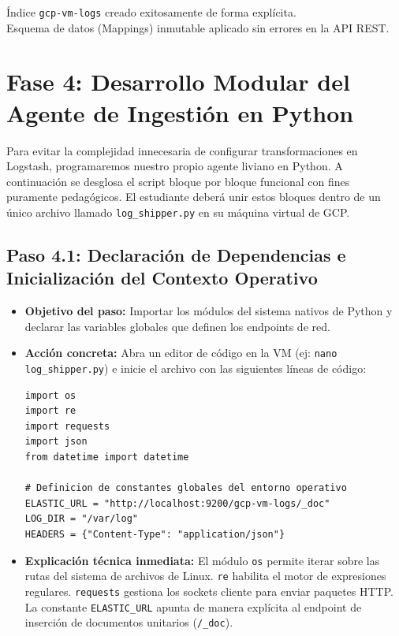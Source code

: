 \documentclass[
  coursetitle={Cómputo Nube y Tecnologías Emergentes},
  coursehours={96},
  coursedate={Verano 2026},
  doctype={Guía de Laboratorio Práctico},
  otherlangs={english,french},
  authorname={Lázaro},
  authorsurname={Bustio-Martínez},
  authortitle={PhD},
  role={Profesor Investigador},
  email={lbustio@inaoe.mx},
  phone={5559504000},
  ext={7459},
  institution={Instituto Nacional de Astrofísica, Óptica y Electrónica (INAOE)},
  department={Maestría en Ciencias en Tecnologías de Seguridad},
  address={Luis Enrique Erro 1, Sta. Ma. Tonantzintla, San Andrés Cholula, CP 72840, Puebla, México},
  margin={0.5in}
]{../../lbustio_lecture_notes}
\begin{document}
\begin{tcolorbox}[colback=green!5!white,colframe=green!60!black,title=\textbf{Checkpoint de Validación 2}]
\checkmark Índice \texttt{gcp-vm-logs} creado exitosamente de forma explícita.\\
\checkmark Esquema de datos (Mappings) inmutable aplicado sin errores en la API REST.
\end{tcolorbox}

\section{Fase 4: Desarrollo Modular del Agente de Ingestión en Python}

Para evitar la complejidad innecesaria de configurar transformaciones en Logstash, programaremos nuestro propio agente liviano en Python. A continuación se desglosa el script bloque por bloque funcional con fines puramente pedagógicos. El estudiante deberá unir estos bloques dentro de un único archivo llamado \texttt{log\_shipper.py} en su máquina virtual de GCP.

\subsection{Paso 4.1: Declaración de Dependencias e Inicialización del Contexto Operativo}
\begin{itemize}
    \item \textbf{Objetivo del paso:} Importar los módulos del sistema nativos de Python y declarar las variables globales que definen los endpoints de red.
    \item \textbf{Acción concreta:} Abra un editor de código en la VM (ej: \texttt{nano log\_shipper.py}) e inicie el archivo con las siguientes líneas de código:
\begin{verbatim}
import os
import re
import requests
import json
from datetime import datetime

# Definicion de constantes globales del entorno operativo
ELASTIC_URL = "http://localhost:9200/gcp-vm-logs/_doc"
LOG_DIR = "/var/log"
HEADERS = {"Content-Type": "application/json"}
\end{verbatim}
    \item \textbf{Explicación técnica inmediata:} El módulo \texttt{os} permite iterar sobre las rutas del sistema de archivos de Linux. \texttt{re} habilita el motor de expresiones regulares. \texttt{requests} gestiona los sockets cliente para enviar paquetes HTTP. La constante \texttt{ELASTIC\_URL} apunta de manera explícita al endpoint de inserción de documentos unitarios (\texttt{/\_doc}).
\end{itemize}
\end{document}
